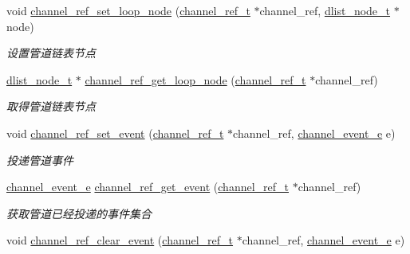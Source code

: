 \begin{DoxyCompactItemize}
void \hyperlink{a00041_a98676b725d853de8a576f97e1eeb9068_a98676b725d853de8a576f97e1eeb9068}{channel\+\_\+ref\+\_\+set\+\_\+loop\+\_\+node} (\hyperlink{a00044_a151271c9d188ef28d4d24bb81dcc1263_a151271c9d188ef28d4d24bb81dcc1263}{channel\+\_\+ref\+\_\+t} $\ast$channel\+\_\+ref, \hyperlink{a00044_a62053232bcf3566010ef98a7d77c3cc8_a62053232bcf3566010ef98a7d77c3cc8}{dlist\+\_\+node\+\_\+t} $\ast$node)
\begin{DoxyCompactList}\small\item\em 设置管道链表节点 \end{DoxyCompactList}\item 
\hyperlink{a00044_a62053232bcf3566010ef98a7d77c3cc8_a62053232bcf3566010ef98a7d77c3cc8}{dlist\+\_\+node\+\_\+t} $\ast$ \hyperlink{a00041_a814d6826477cb62c5e4d6826dfdc418e_a814d6826477cb62c5e4d6826dfdc418e}{channel\+\_\+ref\+\_\+get\+\_\+loop\+\_\+node} (\hyperlink{a00044_a151271c9d188ef28d4d24bb81dcc1263_a151271c9d188ef28d4d24bb81dcc1263}{channel\+\_\+ref\+\_\+t} $\ast$channel\+\_\+ref)
\begin{DoxyCompactList}\small\item\em 取得管道链表节点 \end{DoxyCompactList}\item 
void \hyperlink{a00041_aaa459c5e4bd63d343a31b5968a3ae5bd_aaa459c5e4bd63d343a31b5968a3ae5bd}{channel\+\_\+ref\+\_\+set\+\_\+event} (\hyperlink{a00044_a151271c9d188ef28d4d24bb81dcc1263_a151271c9d188ef28d4d24bb81dcc1263}{channel\+\_\+ref\+\_\+t} $\ast$channel\+\_\+ref, \hyperlink{a00044_a5ad43ab162fdf9ad53cde10ed3d87d99_a5ad43ab162fdf9ad53cde10ed3d87d99}{channel\+\_\+event\+\_\+e} e)
\begin{DoxyCompactList}\small\item\em 投递管道事件 \end{DoxyCompactList}\item 
\hyperlink{a00044_a5ad43ab162fdf9ad53cde10ed3d87d99_a5ad43ab162fdf9ad53cde10ed3d87d99}{channel\+\_\+event\+\_\+e} \hyperlink{a00041_ac24dbde77cfb71c60e1497dfe4cb49f3_ac24dbde77cfb71c60e1497dfe4cb49f3}{channel\+\_\+ref\+\_\+get\+\_\+event} (\hyperlink{a00044_a151271c9d188ef28d4d24bb81dcc1263_a151271c9d188ef28d4d24bb81dcc1263}{channel\+\_\+ref\+\_\+t} $\ast$channel\+\_\+ref)
\begin{DoxyCompactList}\small\item\em 获取管道已经投递的事件集合 \end{DoxyCompactList}\item 
void \hyperlink{a00041_a08e70ed62a98136a26d326e25d1dbeac_a08e70ed62a98136a26d326e25d1dbeac}{channel\+\_\+ref\+\_\+clear\+\_\+event} (\hyperlink{a00044_a151271c9d188ef28d4d24bb81dcc1263_a151271c9d188ef28d4d24bb81dcc1263}{channel\+\_\+ref\+\_\+t} $\ast$channel\+\_\+ref, \hyperlink{a00044_a5ad43ab162fdf9ad53cde10ed3d87d99_a5ad43ab162fdf9ad53cde10ed3d87d99}{channel\+\_\+event\+\_\+e} e)

\end{DoxyCompactItemize}
